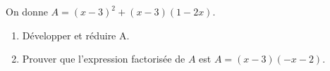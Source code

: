 \documentclass[exercice]{thedocument}%
\begin{document}
%
On donne $A=(x-3)^2+(x-3)(1-2x)$.
\begin{enumerate}
    \item Développer et réduire A.
    \item Prouver que l'expression factorisée de $A$ est $A=(x-3)(-x-2)$.
\end{enumerate}
\end{document}
